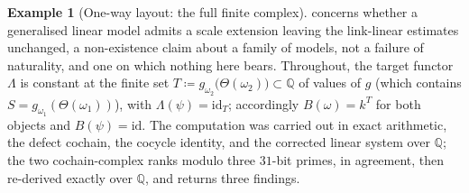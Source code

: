 \documentclass[11pt,a4paper]{article}
\theoremstyle{plain}
\theoremstyle{definition}
\newtheorem{example}[theorem]{Example}
\theoremstyle{remark}
\newcommand{\id}{\mathrm{id}}
\begin{document}
\begin{example}[One-way layout: the full finite complex]
concerns whether a generalised linear model admits a scale extension leaving
the link-linear estimates unchanged, a non-existence claim about a family
of models, not a failure of naturality, and one on which nothing here bears.
Throughout, the target
functor $\Lambda$ is constant at the finite set
$T \coloneqq g_{\omega_2}\bigl(\Theta(\omega_2)\bigr) \subset \mathbb{Q}$ of
values of $g$ (which contains $S = g_{\omega_1}(\Theta(\omega_1))$), with
$\Lambda(\psi) = \id_{T}$; accordingly $B(\omega) = k^{T}$ for both objects and
$B(\psi) = \id$. The computation was
carried out in exact arithmetic, the defect cochain, the cocycle identity,
and the corrected linear system over $\mathbb{Q}$; the two cochain-complex
ranks modulo three $31$-bit primes, in agreement, then re-derived exactly over
$\mathbb{Q}$, and returns three findings.
\end{example}
\end{document}

